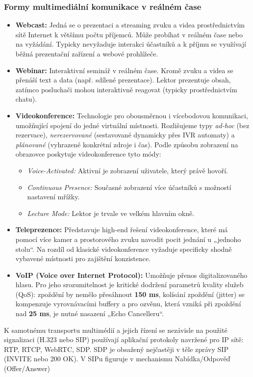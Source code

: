     \subsubsection{Formy multimediální komunikace v reálném čase}
        \begin{itemize}
            \item \textbf{Webcast:} Jedná se o prezentaci a streaming zvuku a videa prostřednictvím sítě Internet k většímu počtu příjemců. Může probíhat v reálném čase nebo na vyžádání. Typicky nevyžaduje interakci účastníků a k příjmu se využívají běžná prezentační zařízení a webové prohlížeče.
            \item \textbf{Webinar:} Interaktivní seminář v reálném čase. Kromě zvuku a videa se přenáší text a data (např. sdílené prezentace). Lektor prezentuje obsah, zatímco posluchači mohou interaktivně reagovat (typicky prostřednictvím chatu).
            \item \textbf{Videokonference:} Technologie pro obousměrnou i vícebodovou komunikaci, umožňující spojení do jedné virtuální místnosti. Rozlišujeme typy \textit{ad-hoc} (bez rezervace), \textit{nerezervované} (sestavované dynamicky přes IVR automaty) a \textit{plánované} (vyhrazené konkrétní zdroje i čas). Podle způsobu zobrazení na obrazovce poskytuje videokonference tyto módy:
            \begin{itemize}
                \item \textit{Voice-Activated:} Aktivní je zobrazení uživatele, který právě hovoří.
                \item \textit{Continuous Presence:} Současné zobrazení více účastníků s možností nastavení mřížky.
                \item \textit{Lecture Mode:} Lektor je trvale ve velkém hlavním okně.
            \end{itemize}
            \item \textbf{Teleprezence:} Představuje high-end řešení videokonference, které má pomocí více kamer a prostorového zvuku navodit pocit jednání u „jednoho stolu“. Na rozdíl od klasické videokonference vyžaduje specificky shodně vybavené místnosti pro zajištění konzistence.
            \item \textbf{VoIP (Voice over Internet Protocol):} Umožňuje přenos digitalizovaného hlasu. Pro jeho srozumitelnost je kritické dodržení parametrů kvality služeb (QoS): zpoždění by nemělo přesáhnout \textbf{150 ms}, kolísání zpoždění (jitter) se kompenzuje vyrovnávacími buffery a pro ozvěnu, která vzniká při zpoždění nad \textbf{25 ms}, je nutné nasazení „Echo Cancelleru“.
        \end{itemize}
        K samotnému transportu multimédií a jejich řízení se nezávisle na použité signalizaci (H.323 nebo SIP) používají aplikační protokoly navržené pro IP sítě: RTP, RTCP, WebRTC, SDP. SDP je obsažený nejčastěji v těle zprávy SIP (INVITE nebo 200 OK). V SIPu figuruje v mechanismu Nabídka/Odpověď (Offer/Answer)
